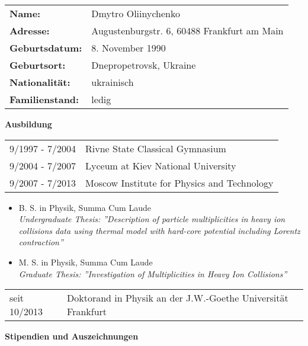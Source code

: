 \begin{lebenslauf}

\begin{tabular}{ll}
\textbf{Name:}           & Dmytro Oliinychenko \\
\textbf{Adresse:}        & Augustenburgstr. 6, 60488 Frankfurt am Main \\
\textbf{Geburtsdatum:}   & 8. November 1990 \\
\textbf{Geburtsort:}     & Dnepropetrovsk, Ukraine \\
\textbf{Nationalit\"at:} & ukrainisch \\
\textbf{Familienstand:}  & ledig \\
\end{tabular}

\vspace{0.5cm}
{\Large \textbf{Ausbildung}} \\

\begin{tabular}{m{4cm}l}
9/1997 - 7/2004  & Rivne State Classical Gymnasium \\
9/2004 - 7/2007  & Lyceum at Kiev National University \\
9/2007 - 7/2013  & Moscow Institute for Physics and Technology \\
\end{tabular}

\begin{itemize}[leftmargin=2.5cm,label=$-$]
  \item B. S. in Physik, Summa Cum Laude \\
        {\small \textit{Undergraduate Thesis: ''Description of particle multiplicities
         in heavy ion collisions data using thermal model with hard-core potential
         including Lorentz contraction''}}
  \item M. S. in Physik, Summa Cum Laude \\
        {\small \textit{Graduate Thesis: ''Investigation of Multiplicities in Heavy Ion
        Collisions''}}
\end{itemize}

\begin{tabular}{m{4cm}l}
seit 10/2013 & Doktorand in Physik an der J.W.-Goethe Universit\"at Frankfurt
\end{tabular}

\vspace{0.5cm}
{\Large \textbf{Stipendien und Auszeichnungen}} \\


\end{lebenslauf}
